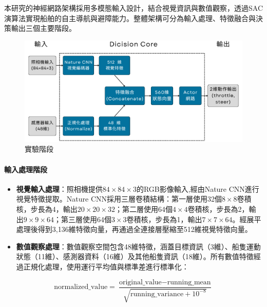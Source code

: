 \documentclass[12pt,a4paper]{article}
\begin{document}
本研究的神經網路架構採用多模態輸入設計，結合視覺資訊與數值觀察，透過SAC演算法實現船舶的自主導航與避障能力。整體架構可分為輸入處理、特徵融合與決策輸出三個主要階段。

\vspace*{0.5cm}

\begin{figure}[h]
    \centering
    \begin{minipage}[t]{1\textwidth}
        \centering
        \includegraphics[width=\textwidth]{image/ModelArch.png}
        \caption{實驗階段}
    \end{minipage}
\end{figure}

\paragraph{輸入處理階段}
\begin{itemize}
	\item \textbf{視覺輸入處理}：照相機提供$84\times84\times3$的RGB影像輸入,經由Nature CNN進行視覺特徵提取。Nature CNN採用三層卷積結構：第一層使用32個$8\times8$卷積核，步長為4，輸出$20\times20\times32$；第二層使用64個$4\times4$卷積核，步長為2，輸出$9\times9\times64$；第三層使用64個$3\times3$卷積核，步長為1，輸出$7\times7\times64$。經展平處理後得到3,136維特徵向量，再通過全連接層壓縮至512維視覺特徵向量。
	\item \textbf{數值觀察處理}：數值觀察空間包含48維特徵，涵蓋目標資訊（3維）、船隻運動狀態（11維）、感測器資料（16維）及其他船隻資訊（18維）。所有數值特徵經過正規化處理，使用運行平均值與標準差進行標準化：
\end{itemize}

\begin{equation}
\text{normalized\_value} = \frac{\text{original\_value} - \text{running\_mean}}{\sqrt{\text{running\_variance} + 10^{-8}}}
\end{equation}
\end{document}
